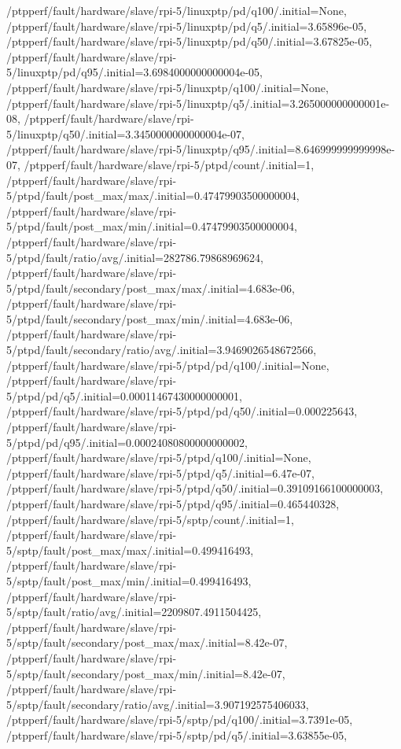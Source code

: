{    /ptpperf/fault/hardware/slave/rpi-5/linuxptp/pd/q100/.initial=None,
    /ptpperf/fault/hardware/slave/rpi-5/linuxptp/pd/q5/.initial=3.65896e-05,
    /ptpperf/fault/hardware/slave/rpi-5/linuxptp/pd/q50/.initial=3.67825e-05,
    /ptpperf/fault/hardware/slave/rpi-5/linuxptp/pd/q95/.initial=3.6984000000000004e-05,
    /ptpperf/fault/hardware/slave/rpi-5/linuxptp/q100/.initial=None,
    /ptpperf/fault/hardware/slave/rpi-5/linuxptp/q5/.initial=3.265000000000001e-08,
    /ptpperf/fault/hardware/slave/rpi-5/linuxptp/q50/.initial=3.3450000000000004e-07,
    /ptpperf/fault/hardware/slave/rpi-5/linuxptp/q95/.initial=8.646999999999998e-07,
    /ptpperf/fault/hardware/slave/rpi-5/ptpd/count/.initial=1,
    /ptpperf/fault/hardware/slave/rpi-5/ptpd/fault/post_max/max/.initial=0.47479903500000004,
    /ptpperf/fault/hardware/slave/rpi-5/ptpd/fault/post_max/min/.initial=0.47479903500000004,
    /ptpperf/fault/hardware/slave/rpi-5/ptpd/fault/ratio/avg/.initial=282786.79868969624,
    /ptpperf/fault/hardware/slave/rpi-5/ptpd/fault/secondary/post_max/max/.initial=4.683e-06,
    /ptpperf/fault/hardware/slave/rpi-5/ptpd/fault/secondary/post_max/min/.initial=4.683e-06,
    /ptpperf/fault/hardware/slave/rpi-5/ptpd/fault/secondary/ratio/avg/.initial=3.9469026548672566,
    /ptpperf/fault/hardware/slave/rpi-5/ptpd/pd/q100/.initial=None,
    /ptpperf/fault/hardware/slave/rpi-5/ptpd/pd/q5/.initial=0.00011467430000000001,
    /ptpperf/fault/hardware/slave/rpi-5/ptpd/pd/q50/.initial=0.000225643,
    /ptpperf/fault/hardware/slave/rpi-5/ptpd/pd/q95/.initial=0.00024080800000000002,
    /ptpperf/fault/hardware/slave/rpi-5/ptpd/q100/.initial=None,
    /ptpperf/fault/hardware/slave/rpi-5/ptpd/q5/.initial=6.47e-07,
    /ptpperf/fault/hardware/slave/rpi-5/ptpd/q50/.initial=0.39109166100000003,
    /ptpperf/fault/hardware/slave/rpi-5/ptpd/q95/.initial=0.465440328,
    /ptpperf/fault/hardware/slave/rpi-5/sptp/count/.initial=1,
    /ptpperf/fault/hardware/slave/rpi-5/sptp/fault/post_max/max/.initial=0.499416493,
    /ptpperf/fault/hardware/slave/rpi-5/sptp/fault/post_max/min/.initial=0.499416493,
    /ptpperf/fault/hardware/slave/rpi-5/sptp/fault/ratio/avg/.initial=2209807.4911504425,
    /ptpperf/fault/hardware/slave/rpi-5/sptp/fault/secondary/post_max/max/.initial=8.42e-07,
    /ptpperf/fault/hardware/slave/rpi-5/sptp/fault/secondary/post_max/min/.initial=8.42e-07,
    /ptpperf/fault/hardware/slave/rpi-5/sptp/fault/secondary/ratio/avg/.initial=3.907192575406033,
    /ptpperf/fault/hardware/slave/rpi-5/sptp/pd/q100/.initial=3.7391e-05,
    /ptpperf/fault/hardware/slave/rpi-5/sptp/pd/q5/.initial=3.63855e-05,
}
